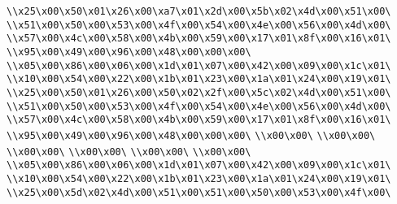 \verb|\\x25\x00\x50\x01\x26\x00\xa7\x01\x2d\x00\x5b\x02\x4d\x00\x51\x00\|\newline
\verb|\\x51\x00\x50\x00\x53\x00\x4f\x00\x54\x00\x4e\x00\x56\x00\x4d\x00\|\newline
\verb|\\x57\x00\x4c\x00\x58\x00\x4b\x00\x59\x00\x17\x01\x8f\x00\x16\x01\|\newline
\verb|\\x95\x00\x49\x00\x96\x00\x48\x00\x00\x00\|\newline
\verb|\\x05\x00\x86\x00\x06\x00\x1d\x01\x07\x00\x42\x00\x09\x00\x1c\x01\|\newline
\verb|\\x10\x00\x54\x00\x22\x00\x1b\x01\x23\x00\x1a\x01\x24\x00\x19\x01\|\newline
\verb|\\x25\x00\x50\x01\x26\x00\x50\x02\x2f\x00\x5c\x02\x4d\x00\x51\x00\|\newline
\verb|\\x51\x00\x50\x00\x53\x00\x4f\x00\x54\x00\x4e\x00\x56\x00\x4d\x00\|\newline
\verb|\\x57\x00\x4c\x00\x58\x00\x4b\x00\x59\x00\x17\x01\x8f\x00\x16\x01\|\newline
\verb|\\x95\x00\x49\x00\x96\x00\x48\x00\x00\x00\|\newline
\verb|\\x00\x00\|\newline
\verb|\\x00\x00\|\newline
\verb|\\x00\x00\|\newline
\verb|\\x00\x00\|\newline
\verb|\\x00\x00\|\newline
\verb|\\x00\x00\|\newline
\verb|\\x05\x00\x86\x00\x06\x00\x1d\x01\x07\x00\x42\x00\x09\x00\x1c\x01\|\newline
\verb|\\x10\x00\x54\x00\x22\x00\x1b\x01\x23\x00\x1a\x01\x24\x00\x19\x01\|\newline
\verb|\\x25\x00\x5d\x02\x4d\x00\x51\x00\x51\x00\x50\x00\x53\x00\x4f\x00\|\newline
